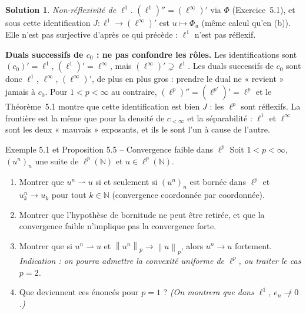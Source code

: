 \documentclass[11pt,a4paper]{article}
\newcommand{\N}{\mathbb{N}}
\newcommand{\norm}[1]{\left\|#1\right\|}
\theoremstyle{definition}
\newtheorem*{solution}{Solution}
\begin{document}
\begin{solution}
\emph{Non-réflexivité de $\ell^1$.} $(\ell^1)''=(\ell^\infty)'$ via $\Phi$ (Exercice~5.1), et sous cette identification $J:\ell^1\to(\ell^\infty)'$ est $u\mapsto\Phi_u$ (même calcul qu'en (b)). Elle n'est pas surjective d'après ce qui précède : $\ell^1$ n'est pas réflexif.
\end{solution}

\begin{piege}
\textbf{Duals successifs de $c_0$ : ne pas confondre les rôles.} Les identifications sont $(c_0)'=\ell^1$, $(\ell^1)'=\ell^\infty$, mais $(\ell^\infty)'\supsetneq\ell^1$. Les duals successifs de $c_0$ sont donc $\ell^1$, $\ell^\infty$, $(\ell^\infty)'$, de plus en plus gros : prendre le dual ne « revient » jamais à $c_0$. Pour $1<p<\infty$ au contraire, $(\ell^p)''=(\ell^{p'})'=\ell^p$ et le Théorème~5.1 montre que cette identification est bien $J$ : les $\ell^p$ sont réflexifs. La frontière est la même que pour la densité de $c_{<\infty}$ et la séparabilité : $\ell^1$ et $\ell^\infty$ sont les deux « mauvais » exposants, et ils le sont l'un à cause de l'autre.
\end{piege}

\begin{exo}{Exemple 5.1 et Proposition 5.5 -- Convergence faible dans $\ell^p$}
Soit $1<p<\infty$, $(u^n)_n$ une suite de $\ell^p(\N)$ et $u\in\ell^p(\N)$.
\begin{enumerate}[label=(\alph*)]
  \item Montrer que $u^n\rightharpoonup u$ si et seulement si $(u^n)_n$ est bornée dans $\ell^p$ et $u^n_k\to u_k$ pour tout $k\in\N$ (convergence coordonnée par coordonnée).
  \item Montrer que l'hypothèse de bornitude ne peut être retirée, et que la convergence faible n'implique pas la convergence forte.
  \item Montrer que si $u^n\rightharpoonup u$ et $\norm{u^n}_p\to\norm u_p$, alors $u^n\to u$ fortement. \emph{Indication : on pourra admettre la convexité uniforme de $\ell^p$, ou traiter le cas $p=2$.}
  \item Que deviennent ces énoncés pour $p=1$ ? \emph{(On montrera que dans $\ell^1$, $e_n\not\rightharpoonup0$.)}
\end{enumerate}
\end{exo}
\end{document}
